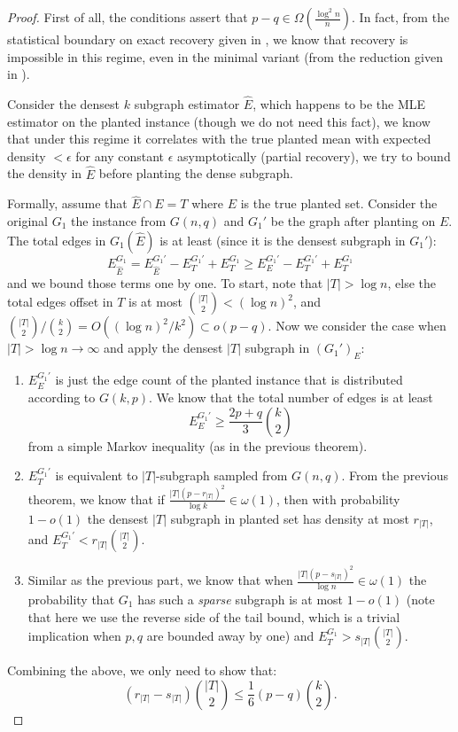 \documentclass[final,12pt]{colt2023} %
\newcommand\1[1]{\mathbb{I}_{\left\{#1\right\}}}
\begin{document}
\begin{proof} 
First of all, the conditions assert that $p-q\in\Omega(\frac{\log^2 n}{n})$. In fact, from the statistical boundary on exact recovery given in \cite{HWX16b}, we know that recovery is impossible in this regime, even in the minimal variant (from the reduction given in ).

\spac
Consider the densest $k$ subgraph estimator $\hat E$, which happens to be the MLE estimator on the planted instance (though we do not need this fact), we know that under this regime it correlates with the true planted mean with expected density $<\epsilon$ for any constant $\epsilon$ asymptotically (partial recovery), we try to bound the density in $\hat E$ before planting the dense subgraph. 

\spac 
Formally, assume that $\hat E\cap E=T$ where $E$ is the true planted set. Consider the original $G_1$ the instance from $G(n, q)$ and $G_1'$ be the graph after planting on $E$. The total edges in $G_1(\hat E)$ is at least (since it is the densest subgraph in $G_1'$):
$$E^{G_1}_{\hat E}= E^{G_1'}_{\hat E}-E^{G_1'}_{T}+E^{G_1}_{T}\geq E^{G_1'}_{E}-E^{G_1'}_{T}+E^{G_1}_{T}$$and we bound those terms one by one. To start, note that $|T|>\log n$, else the total edges offset in $T$ is at most ${|T|\choose 2}<(\log n)^2$, and ${|T|\choose 2}/{k\choose 2}=O((\log n)^2/k^2)\subset o(p-q)$. Now we consider the case when $|T|>\log n\to\infty$ and apply the densest $|T|$ subgraph in $(G_1')_E$:
    \begin{enumerate}
    \item $E^{G_1'}_{E}$ is just the edge count of the planted instance that is distributed according to $G(k, p)$. We know that the total number of edges is at least $$E^{G_1'}_{E}\geq \frac{2p+q}{3}{k\choose 2}$$from a simple Markov inequality (as in the previous theorem).
    \item $E^{G_1'}_{T}$ is equivalent to $|T|$-subgraph sampled from $G(n, q)$. From the previous theorem, we know that if $\frac{|T|(p-r_{|T|})^2}{\log k}\in \omega(1)$, then with probability $1-o(1)$ the densest $|T|$ subgraph in planted set has density at most $r_{|T|}$, and $E^{G_1'}_{T}<r_{|T|}{|T|\choose 2}$.
    
    \item Similar as the previous part, we know that when $\frac{|T|(p-s_{|T|})^2}{\log n}\in \omega(1)$ the probability that $G_1$ has such a \emph{sparse} subgraph is at most $1-o(1)$ (note that here we use the reverse side of the tail bound, which is a trivial implication when $p, q$ are bounded away by one) and $E^{G_1}_{T}>s_{|T|}{|T|\choose 2}$.
\end{enumerate}
Combining  the above, we only need to show that:
$$(r_{|T|}-s_{|T|}){|T|\choose 2}\leq \frac{1}{6}(p-q){k\choose 2}.$$


\end{proof}
\end{document}

